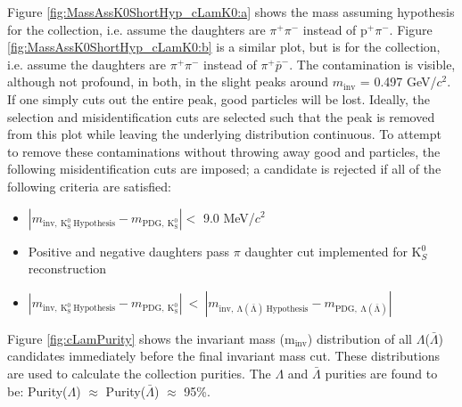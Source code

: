 \documentclass[/home/jesse/Analysis/FemtoAnalysis/AnalysisNotes/AnalysisNoteJBuxton.tex]{subfiles}
\begin{document}
Figure \ref{fig:MassAssK0ShortHyp_cLamK0:a} shows the mass assuming \Ks hypothesis for the \Lam collection, i.e. assume the daughters are $\pi^{+}\pi^{-}$ instead of p$^{+}\pi^{-}$.
Figure \ref{fig:MassAssK0ShortHyp_cLamK0:b} is a similar plot, but is for the \ALam collection, i.e. assume the daughters are $\pi^{+}\pi^{-}$ instead of $\pi^{+}\bar{p}^{-}$.
The \Ks contamination is visible, although not profound, in both, in the slight peaks around $m_{\mathrm{inv}}$ = 0.497 GeV/$c^{2}$.
If one simply cuts out the entire peak, good \Lam particles will be lost.
Ideally, the \Lam selection and \Ks misidentification cuts are selected such that the peak is removed from this plot while leaving the underlying distribution continuous.
To attempt to remove these \Ks contaminations without throwing away good \Lam and \ALam particles, the following misidentification cuts are imposed; a \LamALam candidate is rejected if all of the following criteria are satisfied:
\begin{itemize}
 \item $\left|m_{\mathrm{inv,~ K^{0}_{S}~ Hypothesis}} - m_{\mathrm{PDG,~ K^{0}_{S}}}\right| < $ 9.0 MeV/$c^{2}$
 \item Positive and negative daughters pass $\pi$ daughter cut implemented for K$^{0}_{S}$ reconstruction
 \item $\left|m_{\mathrm{inv,~ K^{0}_{S}~ Hypothesis}} - m_{\mathrm{PDG,~ K^{0}_{S}}}\right|~ < ~\left|m_{\mathrm{inv,~ \Lambda(\bar{\Lambda})~ Hypothesis}} - m_{\mathrm{PDG,~ \Lambda(\bar{\Lambda})}}\right|$
\end{itemize} 


Figure \ref{fig:cLamPurity} shows the invariant mass (m$_{\mathrm{inv}}$) distribution of all $\Lambda$($\bar{\Lambda}$) candidates immediately before the final invariant mass cut.
These distributions are used to calculate the collection purities.
The $\Lambda$ and $\bar{\Lambda}$ purities are found to be: Purity($\Lambda$) $\approx$ Purity($\bar{\Lambda}$) $\approx$ 95\%.
\end{document}
